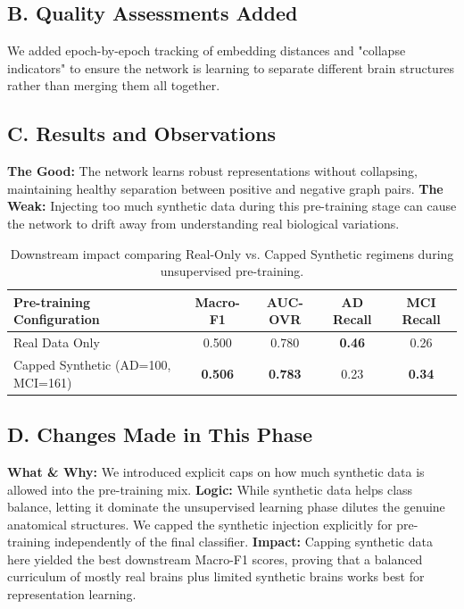 \documentclass[11pt, a4paper]{article}
\begin{document}
\subsection{B. Quality Assessments Added}
We added epoch-by-epoch tracking of embedding distances and "collapse indicators" to ensure the network is learning to separate different brain structures rather than merging them all together.

\subsection{C. Results and Observations}
\textbf{The Good:} The network learns robust representations without collapsing, maintaining healthy separation between positive and negative graph pairs.
\textbf{The Weak:} Injecting too much synthetic data during this pre-training stage can cause the network to drift away from understanding real biological variations.

\begin{table}[H]
\centering
\begin{tabular}{@{}lcccc@{}}
\toprule
\textbf{Pre-training Configuration} & \textbf{Macro-F1} & \textbf{AUC-OVR} & \textbf{AD Recall} & \textbf{MCI Recall} \\
\midrule
Real Data Only & 0.500 & 0.780 & \textbf{0.46} & 0.26 \\
Capped Synthetic (AD=100, MCI=161) & \textbf{0.506} & \textbf{0.783} & 0.23 & \textbf{0.34} \\
\bottomrule
\end{tabular}
\caption{Downstream impact comparing Real-Only vs. Capped Synthetic regimens during unsupervised pre-training.}
\end{table}

\subsection{D. Changes Made in This Phase}
\textbf{What \& Why:} We introduced explicit caps on how much synthetic data is allowed into the pre-training mix.
\textbf{Logic:} While synthetic data helps class balance, letting it dominate the unsupervised learning phase dilutes the genuine anatomical structures. We capped the synthetic injection explicitly for pre-training independently of the final classifier.
\textbf{Impact:} Capping synthetic data here yielded the best downstream Macro-F1 scores, proving that a balanced curriculum of mostly real brains plus limited synthetic brains works best for representation learning.
\end{document}
